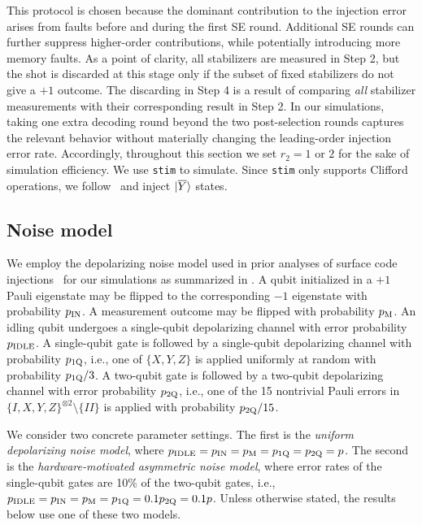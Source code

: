 This protocol is chosen because the dominant contribution to the injection error arises from faults before and during the first SE round. 
Additional SE rounds can further suppress higher-order contributions, while potentially introducing more memory faults. 
As a point of clarity, all stabilizers are measured in Step 2, but the shot is discarded at this stage only if the subset of fixed stabilizers do not give a $+1$ outcome. The discarding in Step 4 is a result of comparing \textit{all} stabilizer measurements with their corresponding result in Step 2.
In our simulations, taking one extra decoding round beyond the two post-selection rounds captures the relevant behavior without materially changing the leading-order injection error rate. Accordingly, throughout this section we set $r_2 = 1$ or $ 2 $ for the sake of simulation efficiency. We use \texttt{stim} to simulate. Since \texttt{stim} only supports Clifford operations, we follow~\cite{gidney_cleaner_2023,sahay_fold-transversal_2025} and inject $\ket{\overline{Y}}$ states.


\subsection{Noise model}
\label{sec:noise-model}

We employ the depolarizing noise model used in prior analyses of surface code injections~\cite{li_magic_2015,lao_magic_2022} for our simulations as summarized in . A qubit initialized in a $+1$ Pauli eigenstate may be flipped to the corresponding $-1$ eigenstate with probability $p_{\rm IN}$. A measurement outcome may be flipped with probability $p_{\rm M}$. An idling qubit undergoes a single-qubit depolarizing channel with error probability $p_{\rm IDLE}$. A single-qubit gate is followed by a single-qubit depolarizing channel with probability $p_{\rm 1Q}$, i.e., one of $\{X,Y,Z\}$ is applied uniformly at random with probability $p_{\rm 1Q}/3$. A two-qubit gate is followed by a two-qubit depolarizing channel with error probability $p_{\rm 2Q}$, i.e., one of the 15 nontrivial Pauli errors in $\{I,X,Y,Z\}^{\otimes 2} \setminus \{II\}$ is applied with probability $p_{\rm 2Q}/15$.

We consider two concrete parameter settings. The first is the \emph{uniform depolarizing noise model}, where $p_{\rm IDLE} = p_{\rm IN} = p_{\rm M} = p_{\rm 1Q} = p_{\rm 2Q} = p$. The second is the \emph{hardware-motivated asymmetric noise model}, where error rates of the single-qubit gates are 10\% of the two-qubit gates, i.e., $p_{\rm IDLE} = p_{\rm IN} = p_{\rm M} = p_{\rm 1Q} = 0.1p_{\rm 2Q} = 0.1p$. Unless otherwise stated, the results below use one of these two models.

